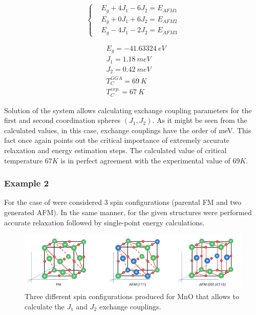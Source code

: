 \begin{multicols}{2}
\begin{equation}
  \left\{
    \begin{aligned}
      & E_g + 4J_1 - 6J_2 = E_{AFM1}\\
      & E_g + 0J_1 + 6J_2 = E_{AFM2}\\
      & E_g - 4J_1 - 2J_2 = E_{AFM3}
    \end{aligned}
  \right.
\end{equation}

\begin{equation}
    \begin{aligned}
      & E_{g} =−41.63324\ eV\\
      & J_{1} =1.18\ meV\\
      & J_{2} =0.42\ meV \\
      & T_C^{GGA} = 69\ K \\
      & T_C^{exp.} = 67\ K
    \end{aligned}
\end{equation}
\end{multicols}


Solution of the system allows calculating exchange coupling parameters for the first and second coordination spheres $(J_1, J_2)$.  As it might be seen from the calculated values, in this case, exchange couplings have the order of meV. This fact once again points out the critical importance of extremely accurate relaxation and energy estimation steps. The calculated value of critical temperature $67K$ is in perfect agreement with the experimental value of $69 K$.

\subsubsection{Example 2}

For the case of  were considered 3 spin configurations (parental FM and two generated AFM). In the same manner, for the given structures were performed accurate relaxation followed by single-point energy calculations. 

\begin{figure}[H]
\centering
\captionsetup{justification=centering,margin=2cm}
\includegraphics[width=160mm]{fig/dft_fig/example_2.png}
\caption[Three different spin configurations
produced for MnO.]{Three different spin configurations
produced for MnO that allows to calculate the $J_1$ and $J_2$ exchange couplings.}
\label{fig:example_2}
\end{figure}

